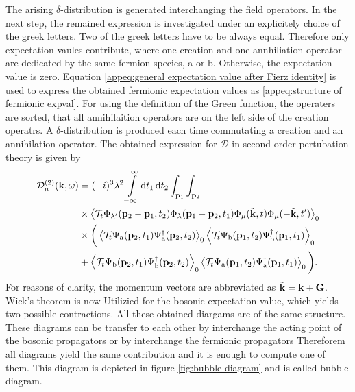 %
The arising $\delta$-distribution is generated interchanging the field operators.
In the next step, the remained expression is investigated under an explicitely choice of the greek letters.
Two of the greek letters have to be always equal.
Therefore only expectation vaules contribute, where one creation and one annhiliation operator are dedicated by the same fermion species, a or b.
Otherwise, the expectation value is zero.
Equation \eqref{appeq:general expectation value after Fierz identity} is used to express the obtained fermionic expectation values as \eqref{appeq:structure of fermionic expval}.
For using the definition of the Green function, the operaters are sorted, that all annihilaition operators are on the left side of the creation operatrs.
A $\delta$-distribution is produced each time commutating a creation and an annihilation operator.
The obtained expression for $\mathcal{D}$ in second order pertubation theory is given by
%
\begin{align}
	\mathcal{D}_{\mu}^{(2)}(\vb{k}, \omega) &= 
		(-i)^{3} \lambda^{2}
		\int\limits_{-\infty}^{\infty} \dd{t_{1}} \dd{t_{2}}
		\int_{\vb{p}_{1}} \int_{\vb{p}_{2}}
		\notag \\ &\times		
		\expval{
			\mathcal{T}_{t} 
			\Phi_{\lambda'} (\vb{p}_{2}-\vb{p}_{1},t_{2}) 
			\Phi_{\lambda} (\vb{p}_{1}-\vb{p}_{2},t_{1}) 
			\Phi_{\mu}(\tilde{\vb{k}},t) 
			\Phi_{\mu}(-\tilde{\vb{k}},t')
		}_{0}
		\notag \\
		&\times
		\bigg(
		\expval{\mathcal{T}_{t} \Psi_{\mathrm{a}}(\vb{p}_{2},t_{1}) \Psi_{\mathrm{a}}^{\dag}(\vb{p}_{2},t_{2})}_{0}
		\expval{\mathcal{T}_{t} \Psi_{\mathrm{b}}(\vb{p}_{1},t_{2})	\Psi_{\mathrm{b}}^{\dag}(\vb{p}_{1},t_{1})}_{0}
		\notag \\
		&+
		\expval{\mathcal{T}_{t}	\Psi_{\mathrm{b}}(\vb{p}_{2},t_{1}) \Psi_{\mathrm{b}}^{\dag}(\vb{p}_{2},t_{2})}_{0}
		\expval{\mathcal{T}_{t}	\Psi_{\mathrm{a}}(\vb{p}_{1},t_{2})	\Psi_{\mathrm{a}}^{\dag}(\vb{p}_{1},t_{1})}_{0}
		\bigg).
\end{align}
%
For reasons of clarity, the momentum vectors are abbreviated as $\tilde{\vb{k}} = \vb{k}+\vb{G}$.
Wick's theorem is now Utilizied for the bosonic expectation value, which yields two possible contractions.
All these obtained diargams are of the same structure.
These diagrams can be transfer to each other by interchange the acting point of the bosonic propagators or by interchange the fermionic propagators
Thereforem all diagrams yield the same contribution and it is enough to compute one of them.
This diagram is depicted in figure \ref{fig:bubble diagram} and is called bubble diagram.
